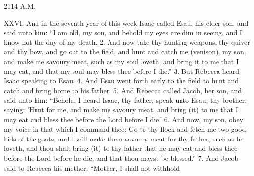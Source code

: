 
2114 A.M.

XXVI. And in the seventh year of this week Isaac called Esau, his elder son, and said unto him: ``I am old, my son, and behold my eyes are dim in seeing, and I know not the day of my death. 2. And now take thy hunting weapons, thy quiver and thy bow, and go out to the field, and hunt and catch me (venison), my son, and make me savoury meat, such as my soul loveth, and bring it to me that I may eat, and that my soul may bless thee before I die.'' 3. But Rebecca heard Isaac speaking to Esau. 4. And Esau went forth early to the field to hunt and catch and bring home to his father. 5. And Rebecca called Jacob, her son, and said unto him: ``Behold, I heard Isaac, thy father, speak unto Esau, thy brother, saying: 'Hunt for me, and make me savoury meat, and bring (it) to me that I may eat and bless thee before the Lord before I die.' 6. And now, my son, obey my voice in that which I command thee: Go to thy flock and fetch me two good kids of the goats, and I will make them savoury meat for thy father, such as he loveth, and thou shalt bring (it) to thy father that he may eat and bless thee before the Lord before he die, and that thou mayst be blessed.'' 7. And Jacob said to Rebecca his mother: ``Mother, I shall not withhold

